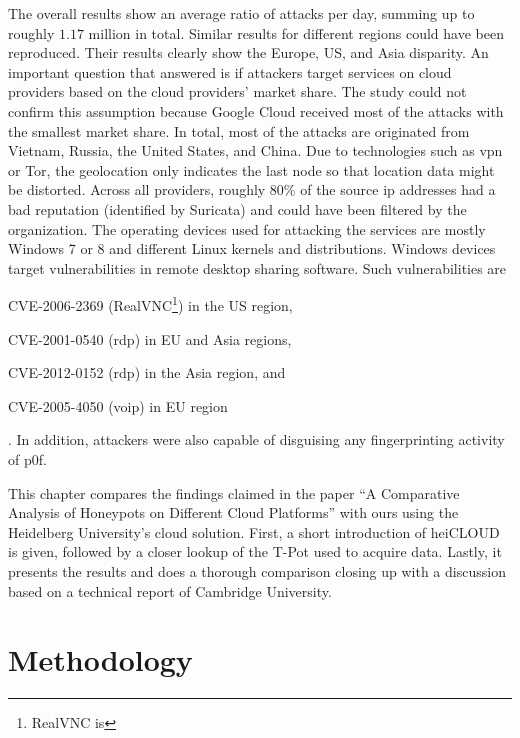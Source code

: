 The overall results show an average ratio of  attacks per day, summing up to roughly $1.17$ million in total.
Similar results for different regions could have been reproduced.
Their results clearly show the Europe, US, and Asia disparity.
An important question that \citet{Kelly2021} answered is if attackers target services on cloud providers based on the cloud providers' market share.
The study could not confirm this assumption because Google Cloud received most of the attacks with the smallest market share.
In total, most of the attacks are originated from Vietnam, Russia, the United States, and China.
Due to technologies such as \ac{vpn} or Tor, the geolocation only indicates the last node so that location data might be distorted.
Across all providers, roughly $80\%$ of the source \ac{ip} addresses had a bad reputation (identified by Suricata) and could have been filtered by the organization.
The operating devices used for attacking the services are mostly Windows 7 or 8 and different Linux kernels and distributions.
Windows devices target vulnerabilities in remote desktop sharing software.
Such vulnerabilities are
\begin{enumerate*}[label=(\roman*)]
    \item CVE-2006-2369\cite{CVE-2006-2369} (RealVNC\footnote{RealVNC is }) in the US region,
    \item CVE-2001-0540\cite{CVE-2001-0540} (\ac{rdp}) in EU and Asia regions,
    \item CVE-2012-0152\cite{CVE-2012-0152} (\ac{rdp}) in the Asia region, and
    \item CVE-2005-4050\cite{CVE-2005-4050} (\ac{voip}) in EU region
\end{enumerate*}.
In addition, attackers were also capable of disguising any fingerprinting activity of p0f.

This chapter compares the findings \citet{Kelly2021} claimed in the paper \enquote{A Comparative Analysis of Honeypots on Different Cloud Platforms} with ours using the Heidelberg University's cloud solution.
First, a short introduction of heiCLOUD is given, followed by a closer lookup of the T-Pot used to acquire data.
Lastly, it presents the results and does a thorough comparison closing up with a discussion based on a technical report of Cambridge University.

\section{Methodology}

